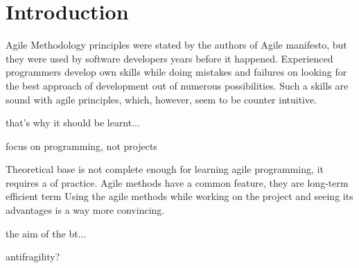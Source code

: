 \chapter*{Introduction} %

Agile Methodology principles were stated by the authors of Agile manifesto, but they were used by software developers years before it happened. Experienced programmers develop own skills while doing mistakes and failures on looking for the best approach of development out of numerous possibilities. Such a skills are sound with agile principles, which, however, seem to be counter intuitive.

that's why it should be learnt...

focus on programming, not projects

Theoretical base is not complete enough for learning agile programming, it requires a of practice. Agile methods have a common feature, they are long-term efficient  term Using the agile methods while working on the project and seeing its advantages is a way more convincing.

the aim of the bt...

antifragility?


